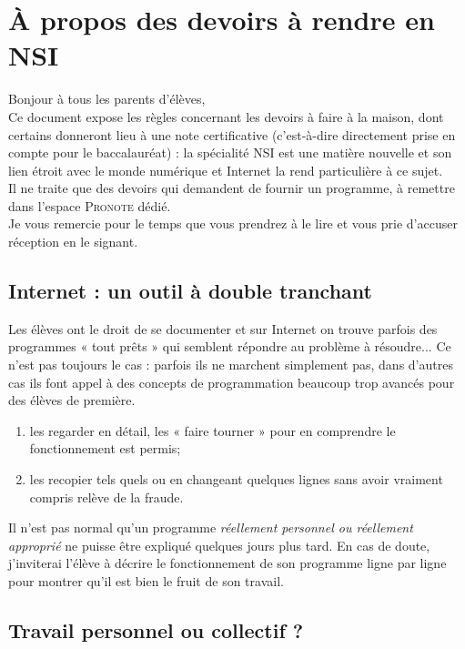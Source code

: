 \documentclass[a4paper,12pt,french]{article}
\begin{document}
\section*{À propos des devoirs à rendre en NSI}


Bonjour à tous les parents d'élèves,\\

Ce document expose les règles concernant les devoirs à faire à la maison, dont certains donneront lieu à une note certificative (c'est-à-dire directement prise en compte pour le baccalauréat) : la spécialité NSI est une matière nouvelle et son lien étroit avec le monde numérique et Internet la rend particulière à ce sujet.\\

Il ne traite que des devoirs qui demandent de fournir un programme, à remettre dans l'espace \textsc{Pronote} dédié.\\

Je vous remercie pour le temps que vous prendrez à le lire et vous prie d'accuser réception en le signant.


\subsection*{Internet : un outil à double tranchant}

Les élèves ont le droit de se documenter et sur Internet on trouve parfois des programmes « tout prêts » qui semblent répondre au problème à résoudre... Ce n'est pas toujours le cas : parfois ils ne marchent simplement pas, dans d'autres cas ils font appel à des concepts de programmation beaucoup trop avancés pour des élèves de première.
\begin{enumerate}[--]
	\item 	les regarder en détail, les « faire tourner » pour en comprendre le fonctionnement est permis;
	\item 	les recopier tels quels ou en changeant quelques lignes sans avoir vraiment compris relève de la fraude.
\end{enumerate}
 Il n'est pas normal qu'un programme \textit{réellement personnel ou réellement approprié} ne puisse être expliqué quelques jours plus tard.
En cas de doute, j'inviterai l'élève à décrire le fonctionnement de son programme ligne par ligne pour montrer qu'il est bien le fruit de son travail.

\subsection*{Travail personnel ou collectif ?}
\end{document}
